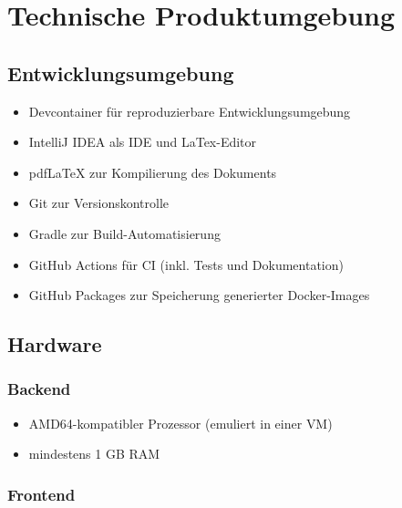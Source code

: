 

\chapter{Technische Produktumgebung}
\label{chap:tech_env}

\section{Entwicklungsumgebung}

\begin{itemize}
    \item Devcontainer für reproduzierbare Entwicklungsumgebung
    \item IntelliJ IDEA als \gls{IDE} und LaTex-Editor
    \item pdfLaTeX zur Kompilierung des Dokuments
    \item \gls{Git} zur Versionskontrolle
    \item \gls{Gradle} zur Build-Automatisierung
    \item \gls{GitHub} Actions für \gls{CI} (inkl. Tests und Dokumentation)
    \item \gls{GitHub} Packages zur Speicherung generierter \gls{Docker}-Images
\end{itemize}

\section{Hardware}

\subsection{Backend}

\begin{itemize}
    \item \gls{AMD64}-kompatibler Prozessor (emuliert in einer \gls{VM})
    \item mindestens 1 GB \gls{RAM}
\end{itemize}

\subsection{Frontend}

